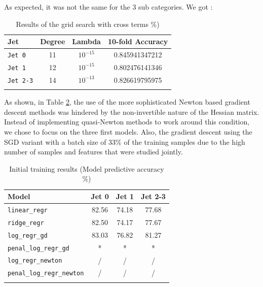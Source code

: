 \documentclass[10pt,conference,compsocconf]{IEEEtran}
\begin{document}
As expected, it was not the same for the 3 sub categories. We got :
\begin{table}[h!]
\centering
\caption{Results of the grid search with cross terms \%)}
\footnotesize
\hspace{-0.2cm}
\begin{tabular}{ l| ccc } 
 \hline
   Jet & Degree & Lambda & 10-fold Accuracy  \\
 \hline
   \verb+Jet 0+  & 11 & $10^{-15}$  & 0.845941347212  \\
   \verb+Jet 1+  & 12 & $10^{-15}$  & 0.802476141346 \\
   \verb+Jet 2-3+  & 14  &  $10^{-13}$ & 0.826619795975 \\
  \hline
\label{grid_search_ridge_cross}
\end{tabular}
\end{table}


As shown, in Table \ref{tab_first_run}, the use of the more sophisticated Newton based gradient descent methods was hindered by the non-invertible nature of the Hessian matrix. Instead of implementing quasi-Newton methods to work around this condition, we chose to focus on the three first models. Also, the gradient descent using the SGD variant with a batch size of 33\% of the training samples due to the high number of samples and features that were studied jointly. 
 
\begin{table}[h!]
\centering
\caption{Initial training results (Model predictive accuracy \%)}
\footnotesize
\hspace{-0.2cm}
\begin{tabular}{ l| ccc } 
 \hline
   Model & Jet 0 & Jet 1 & Jet 2-3  \\
 \hline
   \verb+linear_regr+  & 82.56 &74.18  & 77.68  \\
   \verb+ridge_regr+  & 82.50 & 74.17  & 77.67 \\
   \verb+log_regr_gd+  & 83.03  &  76.82 & 81.27 \\
   \verb+penal_log_regr_gd+  & * & * &  * \\ 
   \verb+log_regr_newton+  & / & / & / \\
   \verb+penal_log_regr_newton+ &  / & / & / \\
  \hline
\label{tab_first_run}
\end{tabular}
\end{table}
\end{document}
